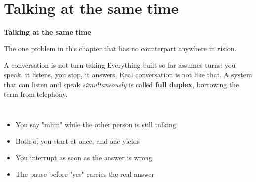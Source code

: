 \documentclass[aspectratio=169]{beamer}
\begin{document}
\section{Talking at the same time}

\begin{frame}[plain]
  \vfill
  \begin{center}
    {\Large\color{popblue}\textbf{Talking at the same time}}\\[0.9em]
    \begin{minipage}{0.82\textwidth}\centering\small
      The one problem in this chapter that has no counterpart anywhere in vision.
    \end{minipage}
  \end{center}
  \vfill
\end{frame}

\begin{frame}{A conversation is not turn-taking}
  \small
  Everything built so far assumes turns: you speak, it listens, you stop, it answers. Real
  conversation is not like that. A system that can listen and speak \emph{simultaneously} is
  called \textbf{full duplex}, borrowing the term from telephony.
  \vskip 6pt
  \begin{columns}[T]
    \footnotesize
    \begin{itemize}\itemsep2pt
      \item You say "mhm" while the other person is still talking
      \item Both of you start at once, and one yields
      \item You interrupt as soon as the answer is wrong
      \item The pause before "yes" carries the real answer
    \end{itemize}
  \end{columns}
  \vskip 10pt
  \centering
\end{frame}
\end{document}
